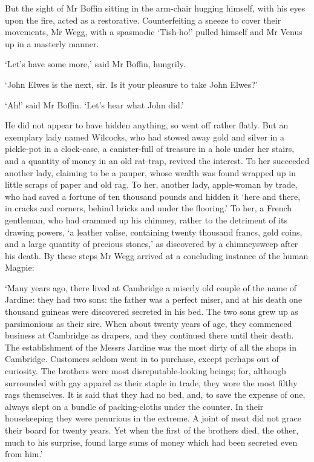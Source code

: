 But the sight of Mr Boffin sitting in the arm-chair hugging himself,
with his eyes upon the fire, acted as a restorative. Counterfeiting a
sneeze to cover their movements, Mr Wegg, with a spasmodic ‘Tish-ho!’
pulled himself and Mr Venus up in a masterly manner.

‘Let’s have some more,’ said Mr Boffin, hungrily.

‘John Elwes is the next, sir. Is it your pleasure to take John Elwes?’

‘Ah!’ said Mr Boffin. ‘Let’s hear what John did.’

He did not appear to have hidden anything, so went off rather flatly.
But an exemplary lady named Wilcocks, who had stowed away gold and
silver in a pickle-pot in a clock-case, a canister-full of treasure in
a hole under her stairs, and a quantity of money in an old rat-trap,
revived the interest. To her succeeded another lady, claiming to be a
pauper, whose wealth was found wrapped up in little scraps of paper and
old rag. To her, another lady, apple-woman by trade, who had saved a
fortune of ten thousand pounds and hidden it ‘here and there, in cracks
and corners, behind bricks and under the flooring.’ To her, a French
gentleman, who had crammed up his chimney, rather to the detriment
of its drawing powers, ‘a leather valise, containing twenty thousand
francs, gold coins, and a large quantity of precious stones,’ as
discovered by a chimneysweep after his death. By these steps Mr Wegg
arrived at a concluding instance of the human Magpie:

‘Many years ago, there lived at Cambridge a miserly old couple of the
name of Jardine: they had two sons: the father was a perfect miser, and
at his death one thousand guineas were discovered secreted in his bed.
The two sons grew up as parsimonious as their sire. When about twenty
years of age, they commenced business at Cambridge as drapers, and
they continued there until their death. The establishment of the Messrs
Jardine was the most dirty of all the shops in Cambridge. Customers
seldom went in to purchase, except perhaps out of curiosity. The
brothers were most disreputable-looking beings; for, although surrounded
with gay apparel as their staple in trade, they wore the most filthy
rags themselves. It is said that they had no bed, and, to save the
expense of one, always slept on a bundle of packing-cloths under the
counter. In their housekeeping they were penurious in the extreme. A
joint of meat did not grace their board for twenty years. Yet when the
first of the brothers died, the other, much to his surprise, found large
sums of money which had been secreted even from him.’

